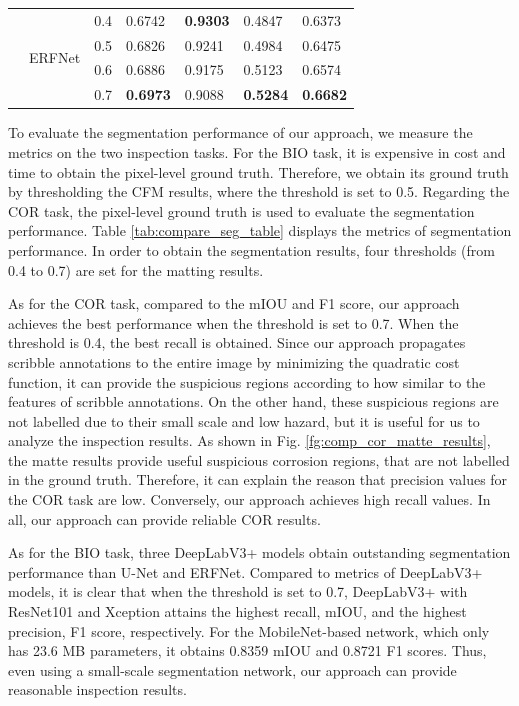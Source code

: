 \documentclass[journal]{IEEEtran}
\begin{document}
\begin{table}[t]
\begin{tabular}{p{1.5cm}p{3.5cm}p{1cm}p{1cm}p{1cm}p{1cm}p{1cm}}
        \cmidrule{2-7}
        & \multirow{4}{3.5cm}{ERFNet}                   & 0.4      & 0.6742           & \textbf{0.9303} & 0.4847          & 0.6373             \\
        &                                               & 0.5      & 0.6826           & 0.9241          & 0.4984          & 0.6475             \\
        &                                               & 0.6      & 0.6886           & 0.9175          & 0.5123          & 0.6574             \\
        &                                               & 0.7      & \textbf{0.6973}  & 0.9088          & \textbf{0.5284} & \textbf{0.6682}    \\
        \bottomrule
    \end{tabular}
\end{table}
To evaluate the segmentation performance of our approach, we measure the metrics on the two inspection tasks. For the BIO task, it is expensive in cost and time to obtain the pixel-level ground truth. Therefore, we obtain its ground truth by thresholding the CFM results, where the threshold is set to 0.5. Regarding the COR task, the pixel-level ground truth is used to evaluate the segmentation performance. Table \ref{tab:compare_seg_table} displays the metrics of segmentation performance. In order to obtain the segmentation results, four thresholds (from 0.4 to 0.7) are set for the matting results. 

As for the COR task, compared to the mIOU and F1 score, our approach achieves the best performance when the threshold is set to 0.7. When the threshold is 0.4, the best recall is obtained. Since our approach propagates scribble annotations to the entire image by minimizing the quadratic cost function, it can provide the suspicious regions according to how similar to the features of scribble annotations. On the other hand, these suspicious regions are not labelled due to their small scale and low hazard, but it is useful for us to analyze the inspection results. As shown in Fig. \ref{fg:comp_cor_matte_results}, the matte results provide useful suspicious corrosion regions, that are not labelled in the ground truth. Therefore, it can explain the reason that precision values for the COR task are low. Conversely, our approach achieves high recall values. In all, our approach can provide reliable COR results. 

As for the BIO task, three DeepLabV3+ models obtain outstanding segmentation performance than U-Net and ERFNet. Compared to metrics of DeepLabV3+ models, it is clear that when the threshold is set to 0.7, DeepLabV3+ with ResNet101 and Xception attains the highest recall, mIOU, and the highest precision, F1 score, respectively. For the MobileNet-based network, which only has 23.6 MB parameters, it obtains 0.8359 mIOU and 0.8721 F1 scores. Thus, even using a small-scale segmentation network, our approach can provide reasonable inspection results.
\end{document}

